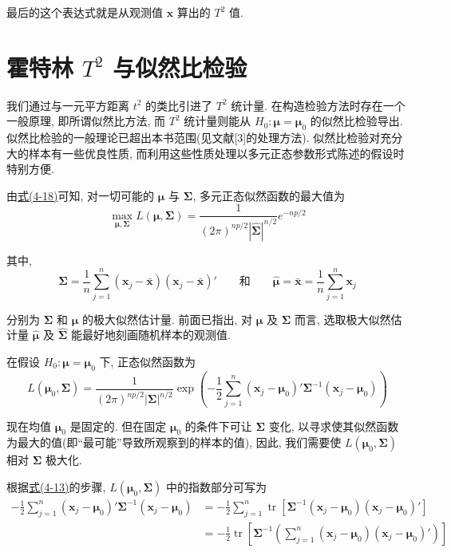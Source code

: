 最后的这个表达式就是从观测值 $\mathbf{x}$ 算出的 $T^2$ 值.

\section{霍特林 $T^2$ 与似然比检验}  %
\label{sec:5.3}

我们通过与一元平方距离 $t^2$ 的类比引进了 $T^2$ 统计量. 在构造检验方法时存在一个一般原理, 即所谓似然比方法, 而 $T^2$ 统计量则能从 $H_0: \boldsymbol{\mu}=\boldsymbol{\mu}_0$ 的似然比检验导出. 似然比检验的一般理论已超出本书范围(见文献[3]的处理方法). 似然比检验对充分大的样本有一些优良性质, 而利用这些性质处理以多元正态参数形式陈述的假设时特别方便.

由\hyperref[eq:4-18]{式(4-18)}可知, 对一切可能的 $\boldsymbol{\mu}$ 与 $\boldsymbol{\Sigma}$, 多元正态似然函数的最大值为
\label{eq:5-10}
\begin{equation}
\max_{\boldsymbol{\mu},\boldsymbol{\Sigma}}L(\boldsymbol{\mu},\boldsymbol{\Sigma})=\frac{1}{(2\pi)^{np/2}|\hat{\boldsymbol{\Sigma}}|^{n/2}}e^{-np/2} \tag{5-10}
\end{equation}

其中,
\[
\hat{\boldsymbol{\Sigma}}=\frac{1}{n}\sum_{j=1}^{n}(\mathbf{x}_j-\bar{\mathbf{x}})(\mathbf{x}_j-\bar{\mathbf{x}})'\qquad\text{和}\qquad \hat{\boldsymbol{\mu}}=\bar{\mathbf{x}}=\frac{1}{n}\sum_{j=1}^{n}\mathbf{x}_j
\]

分别为 $\boldsymbol{\Sigma}$ 和 $\boldsymbol{\mu}$ 的极大似然估计量. 前面已指出, 对 $\boldsymbol{\mu}$ 及 $\boldsymbol{\Sigma}$ 而言, 选取极大似然估计量 $\hat{\boldsymbol{\mu}}$ 及 $\hat{\boldsymbol{\Sigma}}$ 能最好地刻画随机样本的观测值.

在假设 $H_0: \boldsymbol{\mu}=\boldsymbol{\mu}_0$ 下, 正态似然函数为
\[
L(\boldsymbol{\mu}_0,\boldsymbol{\Sigma})=\frac{1}{(2\pi)^{np/2}|\boldsymbol{\Sigma}|^{n/2}}\exp\left(-\frac{1}{2}\sum_{j=1}^{n}(\mathbf{x}_j-\boldsymbol{\mu}_0)'\boldsymbol{\Sigma}^{-1}(\mathbf{x}_j-\boldsymbol{\mu}_0)\right)
\]

现在均值 $\boldsymbol{\mu}_0$ 是固定的. 但在固定 $\boldsymbol{\mu}_0$ 的条件下可让 $\boldsymbol{\Sigma}$ 变化, 以寻求使其似然函数为最大的值(即“最可能”导致所观察到的样本的值), 因此, 我们需要使 $L(\boldsymbol{\mu}_0,\boldsymbol{\Sigma})$ 相对 $\boldsymbol{\Sigma}$ 极大化.

根据\hyperref[eq:4-13]{式(4-13)}的步骤, $L(\boldsymbol{\mu}_0,\boldsymbol{\Sigma})$ 中的指数部分可写为
\begin{align*}
-\frac{1}{2}\sum_{j=1}^{n}(\mathbf{x}_j-\boldsymbol{\mu}_0)'\boldsymbol{\Sigma}^{-1}(\mathbf{x}_j-\boldsymbol{\mu}_0)&=-\frac{1}{2}\sum_{j=1}^{n}\operatorname{tr}\left[\boldsymbol{\Sigma}^{-1}(\mathbf{x}_j-\boldsymbol{\mu}_0)(\mathbf{x}_j-\boldsymbol{\mu}_0)'\right]\\
&=-\frac{1}{2}\operatorname{tr}\left[\boldsymbol{\Sigma}^{-1}\left(\sum_{j=1}^{n}(\mathbf{x}_j-\boldsymbol{\mu}_0)(\mathbf{x}_j-\boldsymbol{\mu}_0)'\right)\right]
\end{align*}

